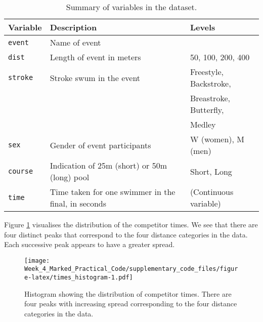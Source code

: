 \documentclass[a4paper,11pt]{article}
\begin{document}
\begin{table}[h]
  \caption{Summary of variables in the dataset.}
  \label{variables}
  \centering
  \begin{tabular}{lll}
    \hline
    \textbf{Variable} & \textbf{Description} & \textbf{Levels} \\
    \hline
    \hline
    \verb|event| & Name of event & \\
    \verb|dist| & Length of event in meters & 50, 100, 200, 400 \\
    \verb|stroke| & Stroke swum in the event & Freestyle, Backstroke, \\
     & & Breastroke, Butterfly, \\
     & & Medley \\
    \verb|sex| & Gender of event participants & W (women), M (men) \\
    \verb|course| & Indication of 25m (short) or 50m (long) pool & Short, Long\\
    \hline
    \verb|time| & Time taken for one swimmer in the final, in seconds & (Continuous variable) \\
    \hline
  \end{tabular}
\end{table}


Figure \ref{distribution_times} visualises the distribution of the competitor times. We see that there are four distinct peaks that correspond to the four distance categories in the data. Each successive peak appears to have a greater spread.

\begin{figure}
  \centering
  \texttt{[image: Week\_4\_Marked\_Practical\_Code/supplementary\_code\_files/figure-latex/times\_histogram-1.pdf]}
  \caption{Histogram showing the distribution of competitor times. There are four peaks with increasing spread corresponding to the four distance categories in the data.}
  \label{distribution_times}
\end{figure}
\end{document}
